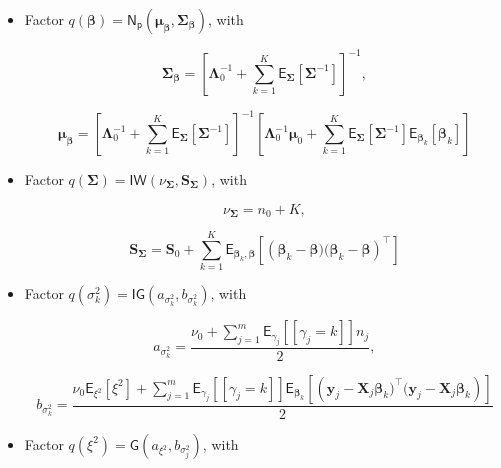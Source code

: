 \begin{itemize}
\item Factor $q(\bm{\beta})=\mathsf{N_p}(\bm{\mu}_{\bm{\beta}},\bm{\Sigma}_{\bm{\beta}})$, with

\begin{equation}
\label{CHLRM_CAVI_Sigma_Beta}
\bm{\Sigma}_{\bm{\beta}} = \left[\bm{\Lambda}_0^{-1}   + \sum_{k=1}^{K}\mathsf{E}_{\bm{\Sigma}}\left[\bm{\Sigma}^{-1}\right]  \right] ^{-1},
\end{equation}

\begin{equation}
\label{CHLRM_CAVI_Mu_Beta}
\bm{\mu}_{\bm{\beta}}= \left[\bm{\Lambda}_0^{-1}   + \sum_{k=1}^{K}\mathsf{E}_{\bm{\Sigma}}\left[\bm{\Sigma}^{-1}\right]  \right]^{-1}\left[\bm{\Lambda}_0^{-1} \bm{\mu}_0 + \sum_{k=1}^{K}\mathsf{E}_{\bm{\Sigma}}\left[\bm{\Sigma}^{-1}\right] \mathsf{E}_{\bm{\beta}_k}\left[\bm{\beta}_k \right]\right]
\end{equation}

\item Factor $q(\bm{\Sigma})=\mathsf{IW}(\nu_{\bm{\Sigma}},\bm{S}_{\bm{\Sigma}})$, with

\begin{equation}
\label{CHLRM_CAVI_nu_Sigma}
\nu_{\bm{\Sigma}} = n_0+K,
\end{equation}

\begin{equation}
\label{CHLRM_CAVI_S_Sigma}
\bm{S}_{\bm{\Sigma}}=  \bm{S}_0 + \sum_{k=1}^{K} \mathsf{E}_{\bm{\beta}_k,\bm{\beta}}\left[\left(\bm{\beta}_k - \bm{\beta})(\bm{\beta}_k - \bm{\beta}\right)^\top\right]
\end{equation}

\item Factor $q(\sigma_k^2)=\mathsf{IG}(a_{\sigma_k^2},b_{\sigma_k^2})$, with

\begin{equation}
\label{CHLRM_CAVI_a_sigma2k}
a_{\sigma_k^2}= \frac{\nu_0 + \sum_{j=1}^{m}\mathsf{E}_{\gamma_j}\left[[\gamma_j=k]\right]n_j}{2},
\end{equation}

\begin{equation}
\label{CHLRM_CAVI_b_sigma2k}
b_{\sigma_k^2}= \frac{ \nu_0 \mathsf{E}_{\xi^2}\left[\xi^2\right] +  \sum_{j=1}^{m}\mathsf{E}_{\gamma_j}\left[[\gamma_j=k]\right]\mathsf{E}_{\bm{\beta}_k}\left[\left(\bm{y}_{j} - \bm{X}_{j} \bm{\beta}_k)^\top(\bm{y}_{j} - \bm{X}_{j} \bm{\beta}_k\right)\right]}{2}
\end{equation}

\item Factor $q(\xi^2)=\mathsf{G}(a_{\xi^2},b_{\sigma_j^2})$, with


\end{itemize}
